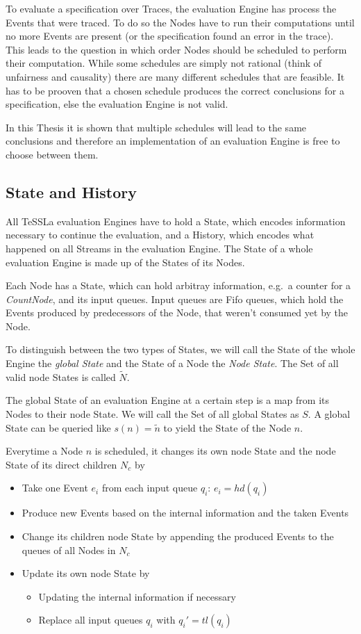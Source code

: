To evaluate a specification over Traces, the evaluation Engine has process the Events that were traced.
To do so the Nodes have to run their computations until no more Events are present (or the specification found an error in the trace).
This leads to the question in which order Nodes should be scheduled to perform their computation.
While some schedules are simply not rational (think of unfairness and causality) there are many different schedules that are feasible.
It has to be prooven that a chosen schedule produces the correct conclusions for a specification, else the evaluation Engine is not valid.

In this Thesis it is shown that multiple schedules will lead to the same conclusions and therefore an implementation of an evaluation Engine is free to choose between them.

\subsection{State and History}
\label{sec:concepts:def:state}

All TeSSLa evaluation Engines have to hold a State, which encodes information necessary to continue the evaluation, and a History, which encodes what happened on all Streams in the evaluation Engine.
The State of a whole evaluation Engine is made up of the States of its Nodes.

Each Node has a State, which can hold arbitray information, e.g.\ a counter for a \emph{CountNode}, and its input queues.
Input queues are Fifo queues, which hold the Events produced by predecessors of the Node, that weren't consumed yet by the Node.

To distinguish between the two types of States, we will call the State of the whole Engine the \emph{global State} and the State of a Node the \emph{Node State}.
The Set of all valid node States is called \(\widetilde{N}\).

The global State of an evaluation Engine at a certain step is a map from its Nodes to their node State.
We will call the Set of all global States as \(S\).
A global State can be queried like \(s(n) = \widetilde{n}\) to yield the State of the Node \(n\).

Everytime a Node \(n\) is scheduled, it changes its own node State and the node State of its direct children \(N_c\) by

\begin{itemize}
  \item Take one Event \(e_i\) from each input queue \(q_i\): \(e_i = hd(q_i)\)
  \item Produce new Events based on the internal information and the taken Events
  \item Change its children node State by appending the produced Events to the queues of all Nodes in \(N_c\)
  \item Update its own node State by
  \begin{itemize}
    \item Updating the internal information if necessary
    \item Replace all input queues \(q_i\) with \(q_i' = tl(q_i)\)
  \end{itemize}
\end{itemize}

